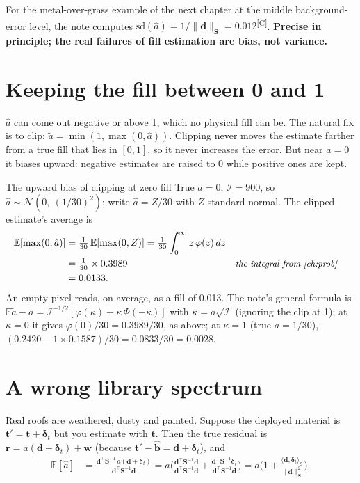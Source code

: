 \documentclass[11pt,a4paper,oneside,openany]{book}
\newcommand{\B}[1]{{\symbf{#1}}}
\newcommand{\B}[1]{{\bm{#1}}}
\newcommand{\comp}{\textsuperscript{\textsf{\scriptsize[C]}}}
\newcommand{\T}{^{\top}}
\newcommand{\E}{\mathbb{E}}
\newcommand{\nrm}[1]{\lVert #1\rVert}
\newcommand{\vt}{\B{t}}
\newcommand{\vbh}{\hat{\B{b}}}
\newcommand{\vr}{\B{r}}
\newcommand{\vd}{\B{d}}
\newcommand{\vw}{\B{w}}
\newcommand{\vdelta}{\B{\delta}}
\newcommand{\mS}{\B{S}}
\newcommand{\ahat}{\hat a}
\newcommand{\why}[1]{&&\text{\small\itshape #1}}
\begin{document}
For the metal-over-grass example of the next chapter at the middle background-error level, the note computes
$\mathrm{sd}(\ahat)=1/\nrm{\vd}_{\mS}=0.012$\comp. \textbf{Precise in principle; the real failures of fill estimation are bias, not variance.}

\section{Keeping the fill between 0 and 1}

$\ahat$ can come out negative or above 1, which no physical fill can be. The natural fix is to clip: $\tilde a=\min(1,\max(0,\ahat))$.
Clipping never moves the estimate farther from a true fill that lies in $[0,1]$, so it never increases the error. But near $a=0$ it biases
upward: negative estimates are raised to 0 while positive ones are kept.

\begin{worked}[label=we:clip]{The upward bias of clipping at zero fill}
True $a=0$, $\mathcal I=900$, so $\ahat\sim\mathcal N(0,\ (1/30)^2)$; write $\ahat=Z/30$ with $Z$ standard normal. The clipped estimate's average is
\begin{align*}
\E[\max(0,\ahat)] &= \tfrac1{30}\,\E[\max(0,Z)]=\tfrac1{30}\int_0^\infty z\,\varphi(z)\,dz\\
 &= \tfrac1{30}\times0.3989 \why{the integral from \cref{ch:prob}}\\
 &= 0.0133 .
\end{align*}
An empty pixel reads, on average, as a fill of 0.013. The note's general formula is
$\E\tilde a-a=\mathcal I^{-1/2}[\varphi(\kappa)-\kappa\,\Phi(-\kappa)]$ with $\kappa=a\sqrt{\mathcal I}$ (ignoring the clip at 1); at $\kappa=0$ it gives
$\varphi(0)/30=0.3989/30$, as above; at $\kappa=1$ (true $a=1/30$), $(0.2420-1\times0.1587)/30=0.0833/30=0.0028$.
\end{worked}

\section{A wrong library spectrum}

Real roofs are weathered, dusty and painted. Suppose the deployed material is $\vt'=\vt+\vdelta_t$ but you estimate with $\vt$. Then the
true residual is $\vr=a(\vd+\vdelta_t)+\vw$ (because $\vt'-\vbh=\vd+\vdelta_t$), and
\begin{align*}
\E[\ahat] &= \frac{\vd\T\mS^{-1}\,a(\vd+\vdelta_t)}{\vd\T\mS^{-1}\vd}
  =a\Big(\frac{\vd\T\mS^{-1}\vd}{\vd\T\mS^{-1}\vd}+\frac{\vd\T\mS^{-1}\vdelta_t}{\vd\T\mS^{-1}\vd}\Big)
  =a\Big(1+\frac{\langle\vd,\vdelta_t\rangle_{\mS}}{\nrm{\vd}^2_{\mS}}\Big).
\end{align*}
\end{document}
